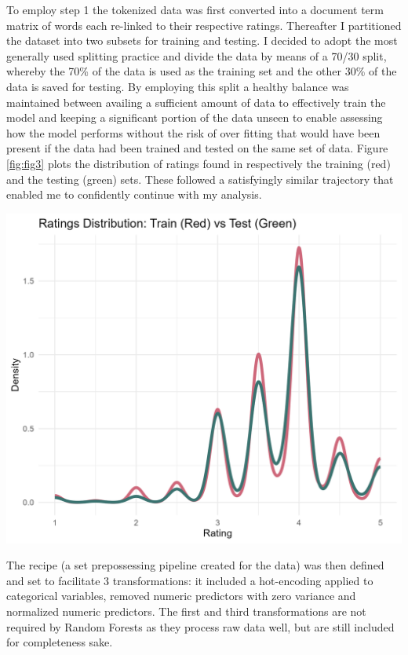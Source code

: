 \documentclass[11pt,preprint]{elsarticle}
\let\origfigure\figure
\let\endorigfigure\endfigure
\renewenvironment{figure}[1][2] {
    \expandafter\origfigure\expandafter[H]
} {
    \endorigfigure
}
\numberwithin{equation}{section}
\numberwithin{figure}{section}
\numberwithin{table}{section}
\begin{document}
To employ step 1 the tokenized data was first converted into a document
term matrix of words each re-linked to their respective ratings.
Thereafter I partitioned the dataset into two subsets for training and
testing. I decided to adopt the most generally used splitting practice
and divide the data by means of a 70/30 split, whereby the 70\% of the
data is used as the training set and the other 30\% of the data is saved
for testing. By employing this split a healthy balance was maintained
between availing a sufficient amount of data to effectively train the
model and keeping a significant portion of the data unseen to enable
assessing how the model performs without the risk of over fitting that
would have been present if the data had been trained and tested on the
same set of data. Figure \ref{fig:fig3} plots the distribution of
ratings found in respectively the training (red) and the testing (green)
sets. These followed a satisfyingly similar trajectory that enabled me
to confidently continue with my analysis.

\begin{figure}[H]

{\centering \includegraphics[width=0.8\linewidth]{writeup/fig3} 

}

\caption{Distribution of training and testing data\label{fig:fig3}}\label{fig:fig3}
\end{figure}

The recipe (a set prepossessing pipeline created for the data) was then
defined and set to facilitate 3 transformations: it included a
hot-encoding applied to categorical variables, removed numeric
predictors with zero variance and normalized numeric predictors. The
first and third transformations are not required by Random Forests as
they process raw data well, but are still included for completeness
sake.
\end{document}
